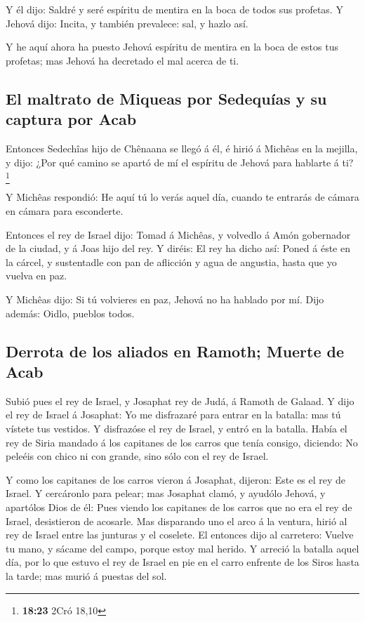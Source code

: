  Y él dijo: Saldré y seré espíritu de mentira en la boca
de todos sus profetas. Y Jehová dijo: Incita, y también prevalece: sal,
y hazlo así.

 Y he aquí ahora ha puesto Jehová espíritu de mentira en
la boca de estos tus profetas; mas Jehová ha decretado el mal acerca de
ti.

\hypertarget{el-maltrato-de-miqueas-por-sedequuxedas-y-su-captura-por-acab}{%
\subsection{El maltrato de Miqueas por Sedequías y su captura por
Acab}\label{el-maltrato-de-miqueas-por-sedequuxedas-y-su-captura-por-acab}}

 Entonces Sedechîas hijo de Chênaana se llegó á él, é
hirió á Michêas en la mejilla, y dijo: ¿Por qué camino se apartó de mí
el espíritu de Jehová para hablarte á ti? \footnote{\textbf{18:23} 2Cró
  18,10}

 Y Michêas respondió: He aquí tú lo verás aquel día,
cuando te entrarás de cámara en cámara para esconderte.

 Entonces el rey de Israel dijo: Tomad á Michêas, y
volvedlo á Amón gobernador de la ciudad, y á Joas hijo del rey.
 Y diréis: El rey ha dicho así: Poned á éste en la
cárcel, y sustentadle con pan de aflicción y agua de angustia, hasta que
yo vuelva en paz.

 Y Michêas dijo: Si tú volvieres en paz, Jehová no ha
hablado por mí. Dijo además: Oidlo, pueblos todos.

\hypertarget{derrota-de-los-aliados-en-ramoth-muerte-de-acab}{%
\subsection{Derrota de los aliados en Ramoth; Muerte de
Acab}\label{derrota-de-los-aliados-en-ramoth-muerte-de-acab}}

 Subió pues el rey de Israel, y Josaphat rey de Judá, á
Ramoth de Galaad.  Y dijo el rey de Israel á Josaphat: Yo
me disfrazaré para entrar en la batalla: mas tú vístete tus vestidos. Y
disfrazóse el rey de Israel, y entró en la batalla. 
Había el rey de Siria mandado á los capitanes de los carros que tenía
consigo, diciendo: No peleéis con chico ni con grande, sino sólo con el
rey de Israel.

 Y como los capitanes de los carros vieron á Josaphat,
dijeron: Este es el rey de Israel. Y cercáronlo para pelear; mas
Josaphat clamó, y ayudólo Jehová, y apartólos Dios de él:
 Pues viendo los capitanes de los carros que no era el
rey de Israel, desistieron de acosarle.  Mas disparando
uno el arco á la ventura, hirió al rey de Israel entre las junturas y el
coselete. El entonces dijo al carretero: Vuelve tu mano, y sácame del
campo, porque estoy mal herido.  Y arreció la batalla
aquel día, por lo que estuvo el rey de Israel en pie en el carro
enfrente de los Siros hasta la tarde; mas murió á puestas del sol.

